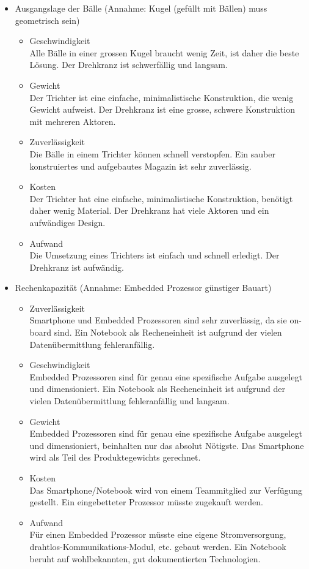 		\begin{itemize}
			\item Ausgangslage der Bälle (Annahme: Kugel (gefüllt mit Bällen) muss geometrisch sein)
				\begin{itemize}
					\item Geschwindigkeit\\
					Alle Bälle in einer grossen Kugel braucht wenig Zeit, ist daher die beste Lösung. Der Drehkranz ist schwerfällig und langsam.
					\item Gewicht\\
					Der Trichter ist eine einfache, minimalistische Konstruktion, die wenig Gewicht aufweist. Der Drehkranz ist eine grosse, schwere Konstruktion mit mehreren Aktoren.
					\item Zuverlässigkeit\\
					Die Bälle in einem Trichter können schnell verstopfen. Ein sauber konstruiertes und aufgebautes Magazin ist sehr zuverlässig. 
					\item Kosten\\
					Der Trichter hat eine einfache, minimalistische Konstruktion, benötigt daher wenig Material. Der Drehkranz hat viele Aktoren und ein aufwändiges Design.
					\item Aufwand\\
					Die Umsetzung eines Trichters ist einfach und schnell erledigt. Der Drehkranz ist aufwändig.					
				\end{itemize}
			\item Rechenkapazität (Annahme: Embedded Prozessor günstiger Bauart)
				\begin{itemize}
					\item Zuverlässigkeit\\
					Smartphone und Embedded Prozessoren sind sehr zuverlässig, da sie on-board sind. Ein Notebook als Recheneinheit ist aufgrund der vielen Datenübermittlung fehleranfällig.
					\item Geschwindigkeit\\
					Embedded Prozessoren sind für genau eine spezifische Aufgabe ausgelegt und dimensioniert. Ein Notebook als Recheneinheit ist aufgrund der vielen Datenübermittlung fehleranfällig und langsam.
				 	\item Gewicht\\
				 	Embedded Prozessoren sind für genau eine spezifische Aufgabe ausgelegt und dimensioniert, beinhalten nur das absolut Nötigste. Das Smartphone wird als Teil des Produktegewichts gerechnet.
					\item Kosten\\
					Das Smartphone/Notebook wird von einem Teammitglied zur Verfügung gestellt. Ein eingebetteter Prozessor müsste zugekauft werden.
					\item Aufwand\\
					Für einen Embedded Prozessor müsste eine eigene Stromversorgung, drahtlos-Kommunikations-Modul, etc. gebaut werden. Ein Notebook beruht auf wohlbekannten, gut dokumentierten Technologien.
				\end{itemize}
				

\end{itemize}
